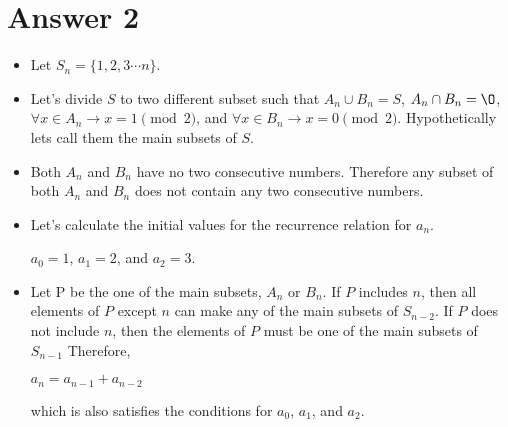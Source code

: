 \documentclass[12pt]{article}
\begin{document}
\section*{Answer 2}
    \begin{itemize}[-]
        \item Let $S_n = \{1, 2, 3 \cdots n\}$.
    
        \item Let's divide $S$ to two different subset such that $A_n \cup B_n = S$, $A_n \cap B_n = \O$,       $\forall x \in A_n \rightarrow x = 1 \pmod 2$, and $\forall x \in B_n \rightarrow x = 0 \pmod 2$. Hypothetically lets call them the main subsets of $S$.
    
        \item Both $A_n$ and $B_n$ have no two consecutive numbers. Therefore any subset of both $A_n$ and $B_n$ does not contain any two consecutive numbers.
        
        \item Let's calculate the initial values for the recurrence relation for $a_n$.
            \begin{center}
                $a_0 = 1$, $a_1 = 2$, and $a_2 = 3$.
            \end{center}{}
            
        \item Let P be the one of the main subsets, $A_n$ or $B_n$. If $P$ includes $n$, then all elements of $P$ except $n$ can make any of the main subsets of $S_{n-2}$. If $P$ does not include $n$, then the elements of $P$ must be one of the main subsets of $S_{n-1}$ Therefore,
            \begin{center}
                $a_n = a_{n-1} + a_{n-2}$
            \end{center}{}
        which is also satisfies the conditions for $a_0$, $a_1$, and $a_2$.
    \end{itemize}{}
\end{document}
